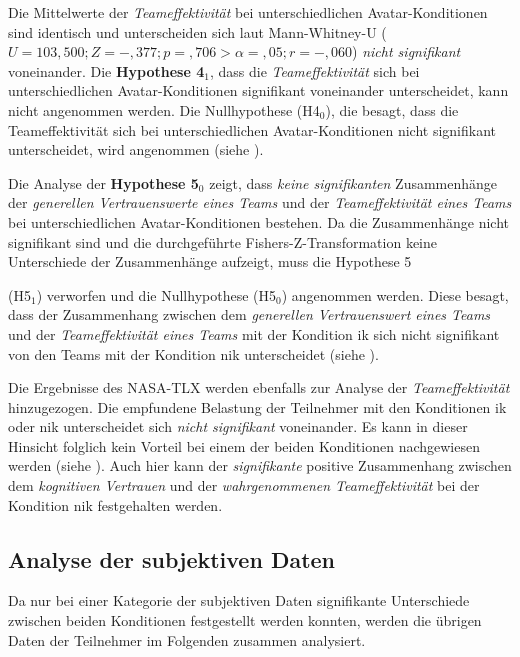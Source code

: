\documentclass[a4paper,11pt]{article}%
\renewcommand{\\}{\vspace*{0.5\baselineskip} \newline}
\begin{document}
{Die Mittelwerte der \textit{Teameffektivität} bei unterschiedlichen Avatar-Konditionen sind identisch und unterscheiden sich laut Mann-Whitney-U ($U = 103,500; Z = -,377; p =,706 > \alpha = ,05; r = -,060$) \textit{nicht signifikant} voneinander. Die \textbf{Hypothese 4$_{1}$}, dass die \textit{Teameffektivität} sich bei unterschiedlichen Avatar-Konditionen signifikant voneinander unterscheidet, kann nicht angenommen werden. Die Nullhypothese (H4$_{0}$), die besagt, dass die Teameffektivität sich bei unterschiedlichen Avatar-Konditionen nicht signifikant unterscheidet, wird angenommen (siehe ).\\

Die Analyse der \textbf{Hypothese 5$_{0}$} zeigt, dass \textit{keine signifikanten} Zusammenhänge der \textit{generellen Vertrauenswerte eines Teams} und der \textit{Teameffektivität eines Teams} bei unterschiedlichen Avatar-Konditionen bestehen. Da die Zusammenhänge nicht signifikant sind und die durchgeführte Fishers-Z-Transformation keine Unterschiede der Zusammenhänge aufzeigt, muss die Hypothese 5 {(H5$_{1}$) verworfen und die Nullhypothese (H5$_{0}$) angenommen werden. Diese besagt, dass der Zusammenhang zwischen dem \textit{generellen Vertrauenswert eines Teams} und der \textit{Teameffektivität eines Teams} mit der Kondition \ac{ik} sich nicht signifikant von den Teams mit der Kondition \ac{nik} unterscheidet (siehe ).\\

Die Ergebnisse des NASA-TLX werden ebenfalls zur Analyse der \textit{Teameffektivität} hinzugezogen. Die empfundene Belastung der Teilnehmer mit den Konditionen \ac{ik} oder \newline \ac{nik} unterscheidet sich \textit{nicht signifikant} voneinander. Es kann in dieser Hinsicht folglich kein Vorteil bei einem der beiden Konditionen nachgewiesen werden (siehe ).
Auch hier kann der \textit{signifikante} positive Zusammenhang zwischen dem \textit{kognitiven Vertrauen} und der \textit{wahrgenommenen Teameffektivität} bei der Kondition \ac{nik} festgehalten werden.

\subsection{Analyse der subjektiven Daten}

Da nur bei einer Kategorie der subjektiven Daten signifikante Unterschiede zwischen beiden Konditionen festgestellt werden konnten, werden die übrigen Daten der Teilnehmer im Folgenden zusammen analysiert.

}}
\end{document}
